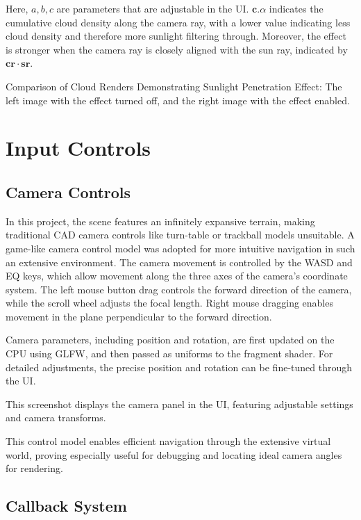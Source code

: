 Here, $a,b,c$ are parameters that are adjustable in the UI. $\mathbf{c}.\alpha$ indicates the cumulative cloud density along the camera ray, with a lower value indicating less cloud density and therefore more sunlight filtering through. Moreover, the effect is stronger when the camera ray is closely aligned with the sun ray, indicated by $\mathbf{cr}\cdot \mathbf{sr}$.

{Comparison of Cloud Renders Demonstrating Sunlight Penetration Effect: The left image with the effect turned off, and the right image with the effect enabled.}


\section{Input Controls}

\subsection{Camera Controls}

In this project, the scene features an infinitely expansive terrain, making traditional CAD camera controls like turn-table or trackball models unsuitable. A game-like camera control model was adopted for more intuitive navigation in such an extensive environment. The camera movement is controlled by the WASD and EQ keys, which allow movement along the three axes of the camera's coordinate system. The left mouse button drag controls the forward direction of the camera, while the scroll wheel adjusts the focal length. Right mouse dragging enables movement in the plane perpendicular to the forward direction. 

Camera parameters, including position and rotation, are first updated on the CPU using GLFW, and then passed as uniforms to the fragment shader. For detailed adjustments, the precise position and rotation can be fine-tuned through the UI.

{This screenshot displays the camera panel in the UI, featuring adjustable settings and camera transforms.}

This control model enables efficient navigation through the extensive virtual world, proving especially useful for debugging and locating ideal camera angles for rendering.

\subsection{Callback System}

